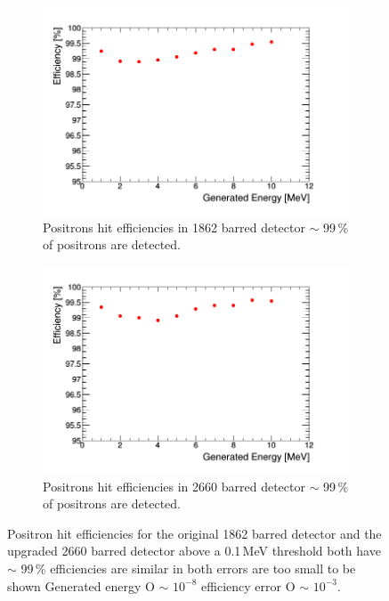 \begin{figure}[htbp]
\centering
\begin{subfigure}{.5\textwidth}
  \centering
  \includegraphics[width=\linewidth]{Chapter4/Figs/Raster/year1Plots/2000_1-10MeV_sec_p_spread_run.png}
  \captionsetup{width=.9\linewidth}
  \caption{Positrons hit efficiencies in 1862 barred detector $\sim$ 99\,\% of positrons are detected.}
  \label{subFig:2000_p_sec}
\end{subfigure}%
\begin{subfigure}{.5\textwidth}
  \centering
  \includegraphics[width=\linewidth]{Chapter4/Figs/Raster/year1Plots/3000_1-10MeV_sec_p_spread_run.png}
  \captionsetup{width=.9\linewidth}
  \caption{Positrons hit efficiencies in 2660 barred detector $\sim$ 99\,\% of positrons are detected.}
  \label{subFig:3000_p_sec}
\end{subfigure}
\caption{Positron hit efficiencies for the original 1862 barred detector and the upgraded 2660 barred detector above a 0.1\,MeV threshold both have $\sim$ 99\,\% efficiencies are similar in both errors are too small to be shown Generated energy O $\sim$ $10^{-8}$ efficiency error O $\sim$ $10^{-3}$.}
\label{fig:2000_3000_p_secs}
\end{figure}

